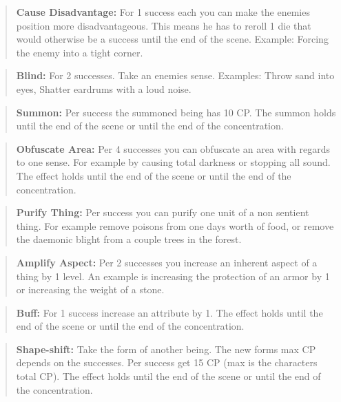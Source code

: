 \documentclass[11pt]{article}
\begin{document}
{\begin{multicols}{2}[]
\begin{quote}
\textbf{Cause Disadvantage:} For 1 success each you can make the enemies position more disadvantageous. This means he has to reroll 1 die that would otherwise be a success until the end of the scene. Example: Forcing the enemy into a tight corner. 
\end{quote}

\begin{quote}
\textbf{Blind:} For 2 successes. Take an enemies sense. Examples: Throw sand into eyes, Shatter eardrums with a loud noise.
\end{quote}

\begin{quote}
\textbf{Summon:} Per success the summoned being has 10 CP. The summon holds until the end of the scene or until the end of the concentration.
\end{quote}

\begin{quote}
\textbf{Obfuscate Area:} Per 4 successes you can obfuscate an area with regards to one sense. For example by causing total darkness or stopping all sound. The effect holds until the end of the scene or until the end of the concentration.
\end{quote}

\begin{quote}
\textbf{Purify Thing:} Per success you can purify one unit of a non sentient thing. For example remove poisons from one days worth of food, or remove the daemonic blight from a couple trees in the forest.
\end{quote}

\begin{quote}
\textbf{Amplify Aspect:} Per 2 successes you increase an inherent aspect of a thing by 1 level. An example is increasing the protection of an armor by 1 or increasing the weight of a stone.
\end{quote}

\begin{quote}
\textbf{Buff:} For 1 success increase an attribute by 1. The effect holds until the end of the scene or until the end of the concentration.
\end{quote}

\begin{quote}
\textbf{Shape-shift:} Take the form of another being. The new forms max CP depends on the successes. Per success get 15 CP (max is the characters total CP). The effect holds until the end of the scene or until the end of the concentration.
\end{quote}


\end{multicols}}
\end{document}
